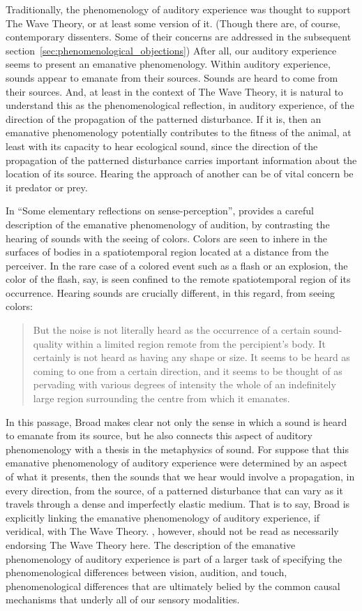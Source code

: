 Traditionally, the phenomenology of auditory experience was thought to support The Wave Theory, or at least some version of it. (Though there are, of course, contemporary dissenters. Some of their concerns are addressed in the subsequent section~\ref{sec:phenomenological_objections}) After all, our auditory experience seems to present an emanative phenomenology. Within auditory experience, sounds appear to emanate from their sources. Sounds are heard to come from their sources. And, at least in the context of The Wave Theory, it is natural to understand this as the phenomenological reflection, in auditory experience, of the direction of the propagation of the patterned disturbance. If it is, then an emanative phenomenology potentially contributes to the fitness of the animal, at least with its capacity to hear ecological sound, since the direction of the propagation of the patterned disturbance carries important information about the location of its source. Hearing the approach of another can be of vital concern be it predator or prey.

In ``Some elementary reflections on sense-perception'', \citet{Broad:1952kx} provides a careful description of the emanative phenomenology of audition, by contrasting the hearing of sounds with the seeing of colors. Colors are seen to inhere in the surfaces of bodies in a spatiotemporal region located at a distance from the perceiver. In the rare case of a colored event such as a flash or an explosion, the color of the flash, say, is seen confined to the remote spatiotemporal region of its occurrence. Hearing sounds are crucially different, in this regard, from seeing colors:
\begin{quote}
	But the noise is not literally heard as the occurrence of a certain sound-quality within a limited region remote from the percipient's body. It certainly is not heard as having any shape or size. It seems to be heard as coming to one from a certain direction, and it seems to be thought of as pervading with various degrees of intensity the whole of an indefinitely large region surrounding the centre from which it emanates. \citep[5]{Broad:1952kx}
\end{quote}
In this passage, Broad makes clear not only the sense in which a sound is heard to emanate from its source, but he also connects this aspect of auditory phenomenology with a thesis in the metaphysics of sound. For suppose that this emanative phenomenology of auditory experience were determined by an aspect of what it presents, then the sounds that we hear would involve a propagation, in every direction, from the source, of a patterned disturbance that can vary as it travels through a dense and imperfectly elastic medium. That is to say, Broad is explicitly linking the emanative phenomenology of auditory experience, if veridical, with The Wave Theory. \citet{Broad:1952kx}, however, should not be read as necessarily endorsing The Wave Theory here. The description of the emanative phenomenology of auditory experience is part of a larger task of specifying the phenomenological differences between vision, audition, and touch, phenomenological differences that are ultimately belied by the common causal mechanisms that underly all of our sensory modalities.

